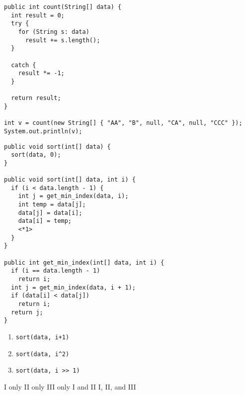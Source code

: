 \documentclass[11pt,addpoints]{exam}
\begin{document}
\begin{questions}
\begin{choices}
\end{choices}

\begin{minipage}{\textwidth}

\begin{verbatim}
public int count(String[] data) {
  int result = 0;
  try {
    for (String s: data)
      result += s.length();
  }

  catch {
    result *= -1;
  }

  return result;
}

int v = count(new String[] { "AA", "B", null, "CA", null, "CCC" });
System.out.println(v);
\end{verbatim}

\begin{choices}
\end{choices}
\end{minipage}

\begin{minipage}{\textwidth}
\begin{verbatim}
public void sort(int[] data) {
  sort(data, 0);
}

public void sort(int[] data, int i) {
  if (i < data.length - 1) {
    int j = get_min_index(data, i);
    int temp = data[j];
    data[j] = data[i];
    data[i] = temp;
    <*1>
  }
}

public int get_min_index(int[] data, int i) {
  if (i == data.length - 1)
    return i;
  int j = get_min_index(data, i + 1);
  if (data[i] < data[j])
    return i;
  return j;
}
\end{verbatim}


\begin{enumerate}[I]
  \item {\tt sort(data, i+1)}
  \item {\tt sort(data, i\textasciicircum2)}
  \item {\tt sort(data, i >> 1)}
\end{enumerate}

\begin{choices}
  \choice I only
  \choice II only
  \choice III only
  \choice I and II
  \choice I, II, and III
\end{choices}


\end{minipage}
\end{questions}
\end{document}
